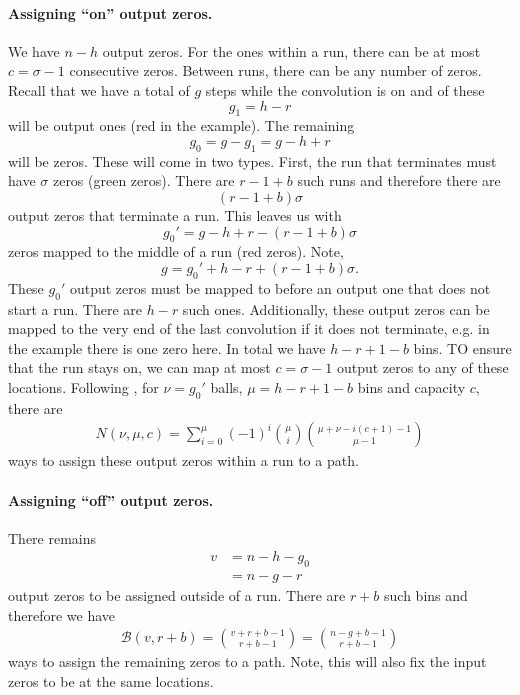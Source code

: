 \paragraph{Assigning ``on'' output zeros.} We have $n-h$ output zeros. For the ones within a run, there can be at most $c=\sigma-1$ consecutive zeros. Between runs, there can be any number of zeros. Recall that we have a total of $g$ steps while the convolution is on and of these 
$$
    g_1 = h-r
$$
will be output ones (red in the example). The remaining
$$
g_0=g-g_1=g-h+r
$$
will be zeros. These will come in two types. First, the run that terminates must have $\sigma$ zeros (green zeros). There are $r-1+b$ such runs and therefore there are
$$
(r-1+b)\sigma
$$
output zeros that terminate a run. This leaves us with
$$
    g_0'=g-h+r-(r-1+b)\sigma
$$
zeros mapped to the middle of a run (red zeros). Note,
$$
    g=g_0'+h-r+(r-1+b)\sigma.
$$
These $g_0'$ output zeros must be mapped to before an output one that does not start a run. There are $h-r$ such ones. Additionally, these output zeros can be mapped to the very end of the last convolution if it does not terminate, e.g. in the example there is one zero here. In total we have  $h-r+1-b$ bins. TO ensure that the run stays on, we can map at most $c=\sigma-1$ output zeros to any of these locations. Following \cite{ballsInBinsCap}, for $\nu=g_0'$ balls, $\mu=h-r+1-b$ bins and capacity $c$, there are 
\begin{align}
N(\nu,\mu, c) = \sum_{i=0}^\mu (-1)^i {\mu \choose i} {\mu +\nu -i (c+1)-1 \choose \mu-1}
\end{align}
ways to assign these output zeros within a run to a path. 

\paragraph{Assigning ``off'' output zeros.} 
There remains
\begin{align*}
v&=n-h-g_0  \\
&=n-g-r
\end{align*}
output zeros to be assigned outside of a run. There are $r+b$ such bins and therefore we have
\begin{align}
\mathcal{B}(v,r+b)={v + r+b-1\choose r+b-1}={n-g+b-1\choose r+b-1}
\end{align}
ways to assign the remaining zeros to a path. Note, this will also fix the input zeros to be at the same locations.



